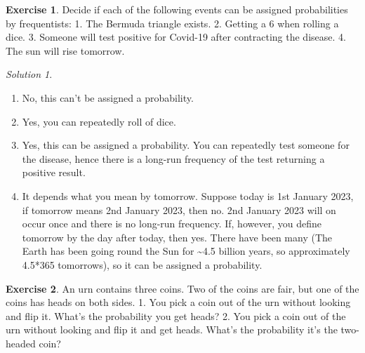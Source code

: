 \documentclass[
]{book}
\providecommand{\tightlist}{%
  \setlength{\itemsep}{0pt}\setlength{\parskip}{0pt}}
\theoremstyle{definition}
\theoremstyle{definition}
\theoremstyle{definition}
\newtheorem{exercise}{Exercise}[chapter]
\theoremstyle{definition}
\theoremstyle{remark}
\newtheorem*{solution}{Solution}
\begin{document}
\begin{exercise}
Decide if each of the following events can be assigned probabilities by frequentists:
1. The Bermuda triangle exists.
2. Getting a 6 when rolling a dice.
3. Someone will test positive for Covid-19 after contracting the disease.
4. The sun will rise tomorrow.
\end{exercise}

\begin{solution}
\leavevmode

\begin{enumerate}
\def\labelenumi{\arabic{enumi}.}
\tightlist
\item
  No, this can't be assigned a probability.
\item
  Yes, you can repeatedly roll of dice.
\item
  Yes, this can be assigned a probability. You can repeatedly test someone for the disease, hence there is a long-run frequency of the test returning a positive result.
\item
  It depends what you mean by tomorrow. Suppose today is 1st January 2023, if tomorrow means 2nd January 2023, then no. 2nd January 2023 will on occur once and there is no long-run frequency. If, however, you define tomorrow by the day after today, then yes. There have been many (The Earth has been going round the Sun for \textasciitilde4.5 billion years, so approximately 4.5*365 tomorrows), so it can be assigned a probability.
\end{enumerate}

\end{solution}

\begin{exercise}
An urn contains three coins. Two of the coins are fair, but one of the coins has heads on both sides.
1. You pick a coin out of the urn without looking and flip it. What's the probability you get heads?
2. You pick a coin out of the urn without looking and flip it and get heads. What's the probability it's the two-headed coin?
\end{exercise}
\end{document}
